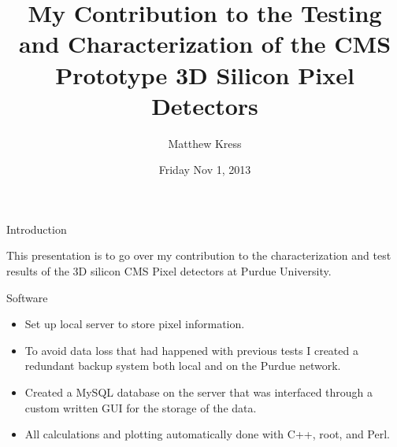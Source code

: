 \documentclass{beamer}
\title[3D Pixels] %
{My Contribution to the Testing and Characterization of the CMS Prototype 3D Silicon Pixel Detectors}
\author[Matthew Kress] %
{Matthew Kress}
\institute[Purdue University] %
\date[Friday Nov 1, 2013] %
{Friday Nov 1, 2013}
\begin{document}
\begin{frame}
  \titlepage
\end{frame}


\begin{frame}{Introduction}
  \begin{center}
    This presentation is to go over my contribution to the characterization and test results of the 3D silicon CMS Pixel detectors at Purdue University.
 \end{center}
\end{frame}


\begin{frame}{Software}
  \begin{center}
    \begin{itemize}
    \item
      Set up local server to store pixel information.
    \item
      To avoid data loss that had happened with previous tests I created a redundant backup system both local and on the Purdue network.
    \item
      Created a MySQL database on the server that was interfaced through a custom written GUI for the storage of the data.
    \item
      All calculations and plotting automatically done with C++, root, and Perl.
     \end{itemize}
 \end{center}
\end{frame}
\end{document}
